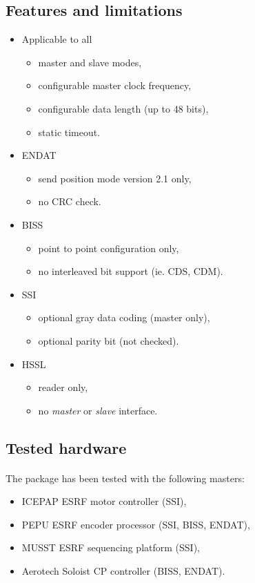 \documentclass[12pt]{article}
\begin{document}
\subsection{Features and limitations}
\begin{itemize}
\item Applicable to all
  \begin{itemize}
  \item master and slave modes,
  \item configurable master clock frequency,
  \item configurable data length (up to 48 bits),
  \item static timeout.
  \end{itemize}
\item ENDAT
  \begin{itemize}
  \item send position mode version 2.1 only,
  \item no CRC check.
  \end{itemize}
\item BISS
  \begin{itemize}
  \item point to point configuration only,
  \item no interleaved bit support (ie. CDS, CDM).
  \end{itemize}
\item SSI
   \begin{itemize}
   \item optional gray data coding (master only),
   \item optional parity bit (not checked).
   \end{itemize}
\item HSSL
   \begin{itemize}
   \item reader only,
   \item no \textit{master} or \textit{slave} interface.
   \end{itemize}
\end{itemize}


\subsection{Tested hardware}
\paragraph{}
The package has been tested with the following masters:
\begin{itemize}
  \item ICEPAP ESRF motor controller (SSI),
  \item PEPU ESRF encoder processor (SSI, BISS, ENDAT),
  \item MUSST ESRF sequencing platform (SSI),
  \item Aerotech Soloist CP controller (BISS, ENDAT).
\end{itemize}
\end{document}
